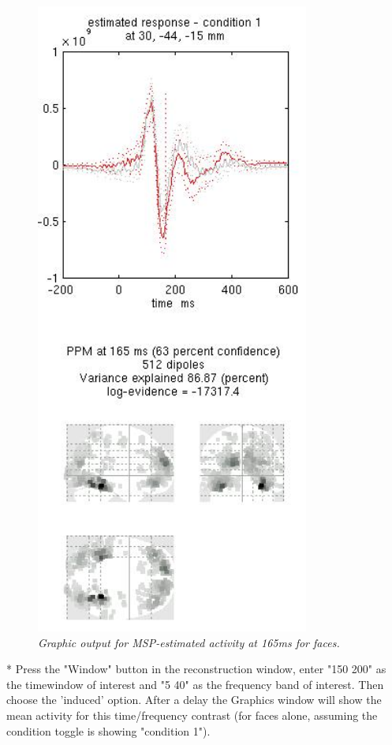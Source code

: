 \begin{figure}
\begin{center}
\includegraphics[width=90mm]{multimodal/figures/figure_32_18}
\caption{\em  Graphic output for MSP-estimated activity at 165ms for faces.\label{fig_32_18}}
\end{center}
\end{figure}

* Press the "Window" button in the reconstruction window, enter "150 200" as the timewindow of interest and "5 40" as the frequency band of interest. Then choose the 'induced' option. After a delay the Graphics window will show the mean activity for this time/frequency contrast (for faces alone, assuming the condition toggle is showing "condition 1").

